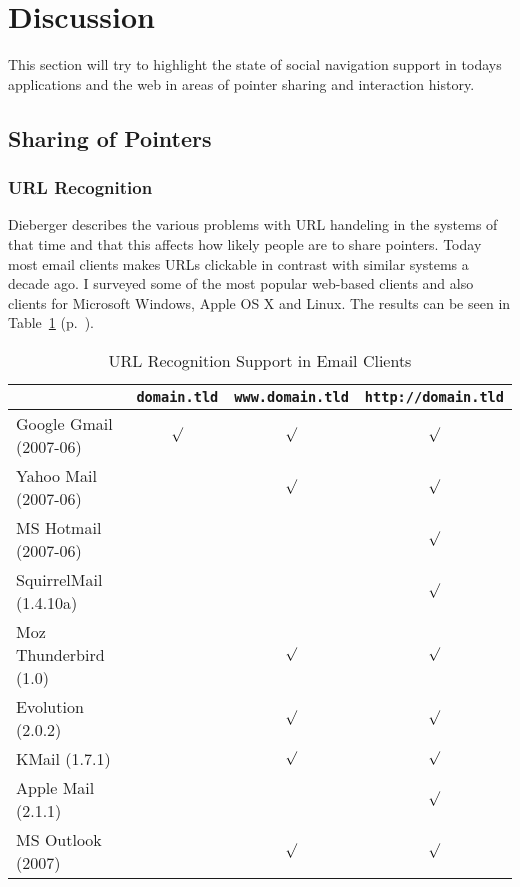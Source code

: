 \documentclass[12pt,a4paper]{article}
\begin{document}
\section{Discussion}

This section will try to highlight the state of social navigation support in
todays applications and the web in areas of pointer sharing and interaction
history.

\subsection{Sharing of Pointers}

\subsubsection{URL Recognition}

Dieberger describes the various problems with URL handeling in the systems of
that time and that this affects how likely people are to share pointers. Today
most email clients makes URLs clickable in contrast with similar systems a
decade ago. I surveyed some of the most popular web-based clients and also
clients for Microsoft Windows, Apple OS X and Linux. The results can be seen
in Table~\ref{table:email} (p.~\pageref{table:email}).

\begin{table}[h!b!p!]
  \caption{URL Recognition Support in Email Clients}
  \label{table:email}
  \begin{center}
    \begin{small}
      \begin{tabular}{l|ccc}
        \hline
        &
        \texttt{domain.tld} &
        \texttt{www.domain.tld} &
        \texttt{http://domain.tld} \\
        \hline
        \hline
        Google Gmail (2007-06) & $\surd$ & $\surd$ & $\surd$ \\
        Yahoo Mail (2007-06)   &         & $\surd$ & $\surd$ \\
        MS Hotmail (2007-06)   &         &         & $\surd$ \\
        SquirrelMail (1.4.10a) &         &         & $\surd$ \\
        Moz Thunderbird (1.0)  &         & $\surd$ & $\surd$ \\
        Evolution (2.0.2)      &         & $\surd$ & $\surd$ \\
        KMail (1.7.1)          &         & $\surd$ & $\surd$ \\
        Apple Mail (2.1.1)     &         &         & $\surd$ \\
        MS Outlook (2007)      &         & $\surd$ & $\surd$ \\
        \hline
      \end{tabular}
    \end{small}
  \end{center}
\end{table}
\end{document}

